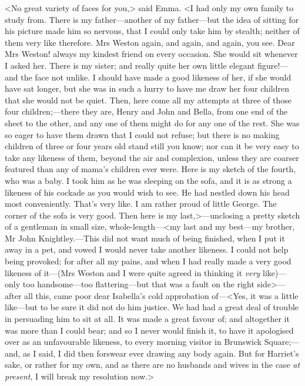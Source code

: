 <No great variety of faces for you,> said Emma. <I had only my own family to study from. There is my father—another of my father—but the idea of sitting for his picture made him so nervous, that I could only take him by stealth; neither of them very like therefore. Mrs Weston again, and again, and again, you see. Dear Mrs Weston! always my kindest friend on every occasion. She would sit whenever I asked her. There is my sister; and really quite her own little elegant figure!—and the face not unlike. I should have made a good likeness of her, if she would have sat longer, but she was in such a hurry to have me draw her four children that she would not be quiet. Then, here come all my attempts at three of those four children;—there they are, Henry and John and Bella, from one end of the sheet to the other, and any one of them might do for any one of the rest. She was so eager to have them drawn that I could not refuse; but there is no making children of three or four years old stand still you know; nor can it be very easy to take any likeness of them, beyond the air and complexion, unless they are coarser featured than any of mama's children ever were. Here is my sketch of the fourth, who was a baby. I took him as he was sleeping on the sofa, and it is as strong a likeness of his cockade as you would wish to see. He had nestled down his head most conveniently. That's very like. I am rather proud of little George. The corner of the sofa is very good. Then here is my last,>—unclosing a pretty sketch of a gentleman in small size, whole-length—<my last and my best—my brother, Mr John Knightley.—This did not want much of being finished, when I put it away in a pet, and vowed I would never take another likeness. I could not help being provoked; for after all my pains, and when I had really made a very good likeness of it—(Mrs Weston and I were quite agreed in thinking it \textit{very} like)—only too handsome—too flattering—but that was a fault on the right side>—after all this, came poor dear Isabella's cold approbation of—<Yes, it was a little like—but to be sure it did not do him justice. We had had a great deal of trouble in persuading him to sit at all. It was made a great favour of; and altogether it was more than I could bear; and so I never would finish it, to have it apologised over as an unfavourable likeness, to every morning visitor in Brunswick Square;—and, as I said, I did then forswear ever drawing any body again. But for Harriet's sake, or rather for my own, and as there are no husbands and wives in the case \textit{at present}, I will break my resolution now.>

